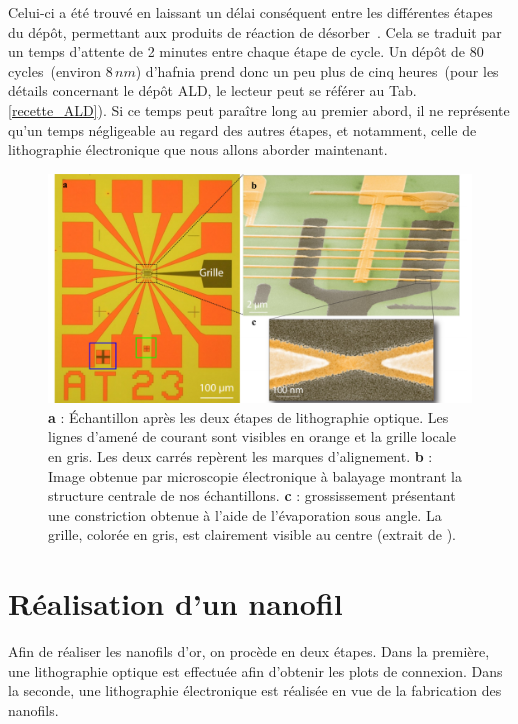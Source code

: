 Celui-ci a été trouvé en laissant un délai conséquent entre les différentes étapes du dépôt, permettant aux produits de réaction de désorber~\cite{Biercuk2003}. Cela se traduit par un temps d'attente de 2 minutes entre chaque étape de cycle. Un dépôt de 80\,cycles~(environ $8\,nm$) d'hafnia prend donc un peu plus de cinq heures~(pour les détails concernant le dépôt ALD, le lecteur peut se référer au Tab.\ref{recette_ALD}). Si ce temps peut paraître long au premier abord, il ne représente qu'un temps négligeable au regard des autres étapes, et notamment, celle de lithographie électronique que nous allons aborder maintenant.

\begin{figure}
\centering \includegraphics[scale=0.45]{Fabrication/FinalResult/FinalResult.pdf}
\caption{\textbf{a} : Échantillon après les deux étapes de lithographie optique. Les lignes d'amené de courant sont visibles en orange et la grille locale en gris. Les deux carrés repèrent les marques d'alignement. \textbf{b} : Image obtenue par microscopie électronique à balayage montrant la structure centrale de nos échantillons. \textbf{c} : grossissement présentant une constriction obtenue à l'aide de l'évaporation sous angle. La grille, colorée en gris, est clairement visible au centre (extrait de \cite{RochPhD}).}
\label{FinalResult}
\end{figure}


\section{Réalisation d'un nanofil}

Afin de réaliser les nanofils d'or, on procède en deux étapes. Dans la première, une lithographie optique est effectuée afin d'obtenir les plots de connexion. Dans la seconde, une lithographie électronique est réalisée en vue de la fabrication des nanofils.

